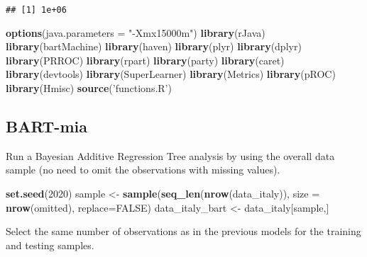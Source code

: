 \documentclass[]{article}
\newenvironment{Shaded}{\begin{snugshade}}{\end{snugshade}}
\newcommand{\DataTypeTok}[1]{\textcolor[rgb]{0.13,0.29,0.53}{#1}}
\newcommand{\DecValTok}[1]{\textcolor[rgb]{0.00,0.00,0.81}{#1}}
\newcommand{\KeywordTok}[1]{\textcolor[rgb]{0.13,0.29,0.53}{\textbf{#1}}}
\newcommand{\NormalTok}[1]{#1}
\newcommand{\OtherTok}[1]{\textcolor[rgb]{0.56,0.35,0.01}{#1}}
\newcommand{\StringTok}[1]{\textcolor[rgb]{0.31,0.60,0.02}{#1}}
\begin{document}
\begin{verbatim}
## [1] 1e+06
\end{verbatim}

\begin{Shaded}
\begin{Highlighting}[]
\KeywordTok{options}\NormalTok{(}\DataTypeTok{java.parameters =} \StringTok{"-Xmx15000m"}\NormalTok{)}
\KeywordTok{library}\NormalTok{(rJava)}
\KeywordTok{library}\NormalTok{(bartMachine)}
\KeywordTok{library}\NormalTok{(haven)}
\KeywordTok{library}\NormalTok{(plyr)}
\KeywordTok{library}\NormalTok{(dplyr)}
\KeywordTok{library}\NormalTok{(PRROC)}
\KeywordTok{library}\NormalTok{(rpart)}
\KeywordTok{library}\NormalTok{(party)}
\KeywordTok{library}\NormalTok{(caret)}
\KeywordTok{library}\NormalTok{(devtools)}
\KeywordTok{library}\NormalTok{(SuperLearner)}
\KeywordTok{library}\NormalTok{(Metrics)}
\KeywordTok{library}\NormalTok{(pROC)}
\KeywordTok{library}\NormalTok{(Hmisc)}
\KeywordTok{source}\NormalTok{(}\StringTok{'functions.R'}\NormalTok{)}
\end{Highlighting}
\end{Shaded}

\hypertarget{bart-mia}{%
\subsection{BART-mia}\label{bart-mia}}

Run a Bayesian Additive Regression Tree analysis by using the overall
data sample (no need to omit the observations with missing values).

\begin{Shaded}
\begin{Highlighting}[]
\KeywordTok{set.seed}\NormalTok{(}\DecValTok{2020}\NormalTok{)}
\NormalTok{sample <-}\StringTok{ }\KeywordTok{sample}\NormalTok{(}\KeywordTok{seq_len}\NormalTok{(}\KeywordTok{nrow}\NormalTok{(data_italy)),}
                 \DataTypeTok{size =} \KeywordTok{nrow}\NormalTok{(omitted),}
                 \DataTypeTok{replace=}\OtherTok{FALSE}\NormalTok{) }
\NormalTok{data_italy_bart <-}\StringTok{ }\NormalTok{data_italy[sample,]}
\end{Highlighting}
\end{Shaded}

Select the same number of observations as in the previous models for the
training and testing samples.
\end{document}
